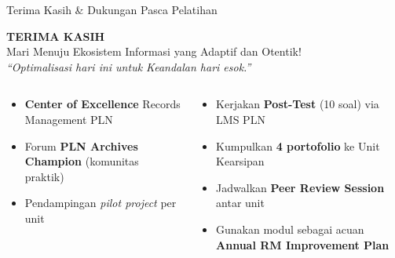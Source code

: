 \documentclass[aspectratio=169,11pt]{beamer}
\begin{document}
\begin{frame}{Terima Kasih \& Dukungan Pasca Pelatihan}
    \vspace{0.5cm}
    \begin{center}
        \huge \textcolor{plnblue}{\textbf{TERIMA KASIH}}\\[0.3cm]
        \large Mari Menuju Ekosistem Informasi yang Adaptif dan Otentik!\\[0.6cm]
        \normalsize \textit{``Optimalisasi hari ini untuk Keandalan hari esok.''}
    \end{center}
    \vspace{0.4cm}
    \begin{columns}[T]
        \begin{premiumbox}
            \scriptsize
            \begin{itemize}
                \item \textbf{Center of Excellence} Records Management PLN
                \item Forum \textbf{PLN Archives Champion} (komunitas praktik)
                \item Pendampingan \textit{pilot project} per unit
            \end{itemize}
        \end{premiumbox}
        
        \begin{greenbox}
            \scriptsize
            \begin{itemize}
                \item Kerjakan \textbf{Post-Test} (10 soal) via LMS PLN
                \item Kumpulkan \textbf{4 portofolio} ke Unit Kearsipan
                \item Jadwalkan \textbf{Peer Review Session} antar unit
                \item Gunakan modul sebagai acuan \textbf{Annual RM Improvement Plan}
            \end{itemize}
        \end{greenbox}
    \end{columns}
\end{frame}
\end{document}
